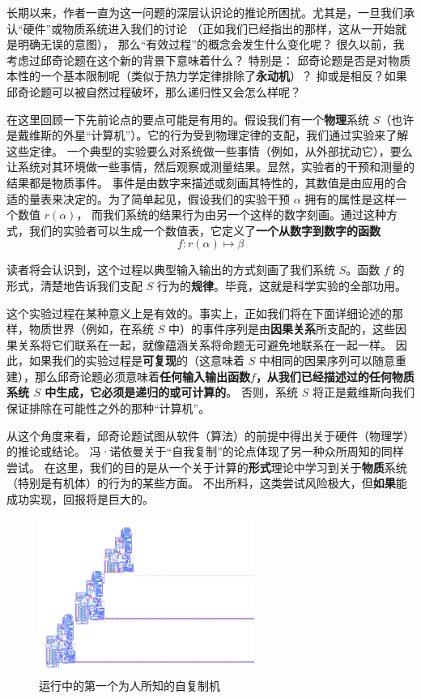 \documentclass[a4paper,12pt]{article}
\begin{document}
长期以来，作者一直为这一问题的深层认识论的推论所困扰\cite{RosenR1962}。尤其是，一旦我们承认“硬件”或物质系统进入我们的讨论
（正如我们已经指出的那样，这从一开始就是明确无误的意图）， 那么“有效过程”的概念会发生什么变化呢？
很久以前\cite{RosenR1962}，我考虑过邱奇论题在这个新的背景下意味着什么？ 特别是：
邱奇论题是否是对物质本性的一个基本限制呢（类似于热力学定律排除了\textbf{永动机}）？
抑或是相反？如果邱奇论题可以被自然过程破坏，那么递归性又会怎么样呢？

在这里回顾一下先前论点的要点可能是有用的。假设我们有一个\textbf{物理}系统 $S$（也许是戴维斯的外星“计算机”）。它的行为受到物理定律的支配，我们通过实验来了解这些定律。
一个典型的实验要么对系统做一些事情（例如，从外部扰动它），要么让系统对其环境做一些事情，然后\gls{观察}或\gls{测量}结果。显然，实验者的干预和测量的结果都是\gls{物质事件}。
\gls{事件}是由数字来描述或刻画其特性的，其数值是由应用的合适的量表来决定的\cite{RosenR1978}。为了简单起见，假设我们的实验干预 $\alpha$ 拥有的属性是这样一个数值 $r(\alpha)$，
而我们系统的结果行为由另一个这样的数字刻画。通过这种方式，我们的实验者可以生成一个数值表，它定义了\textbf{一个从数字到数字的函数}  \begin{equation}\label{eq:1} f: r(\alpha) \mapsto \beta\end{equation}

读者将会认识到，这个过程以典型输入输出的方式刻画了我们系统 $S$。函数 $f$ 的形式，清楚地告诉我们支配 $S$ 行为的\textbf{规律}。毕竟，这就是\gls{科学实验}的全部功用。

这个实验过程在某种意义上是有效的。事实上，正如我们将在下面详细论述的那样，\gls{物质世界}（例如，在系统 $S$ 中）的\gls{事件序列}是由\textbf{\gls{因果关系}}所支配的，这些因果关系将它们联系在一起，就像\gls{蕴涵关系}将命题无可避免地联系在一起一样。
因此，如果我们的实验过程是\textbf{\gls{可复现}}的（这意味着 $S$ 中相同的\gls{因果序列}可以随意重建），那么邱奇论题必须意味着\textbf{任何输入输出函数\hyperref[eq:1]{$f$}，从我们已经描述过的任何物质系统 $S$ 中生成，它必须是递归的或\gls{可计算}的}。
否则，系统 $S$ 将正是戴维斯向我们保证排除在可能性之外的那种“计算机”。

从这个角度来看，邱奇论题试图从软件（算法）的前提中得出关于硬件（物理学）的推论或结论。
冯·诺依曼关于“自我复制”的论点\cite{BurksA1966}体现了另一种众所周知的同样尝试。
在这里，我们的目的是从一个关于计算的\textbf{形式}理论中学习到关于\textbf{物质}系统（特别是有机体）的行为的某些方面。
不出所料，这类尝试风险极大，但\textbf{如果}能成功实现，回报将是巨大的。

\begin{figure}[ht]
\centering
\includegraphics[height=2.0in]{images/self_reprod.png}
\caption{运行中的第一个为人所知的自复制机}
\end{figure}
\end{document}
